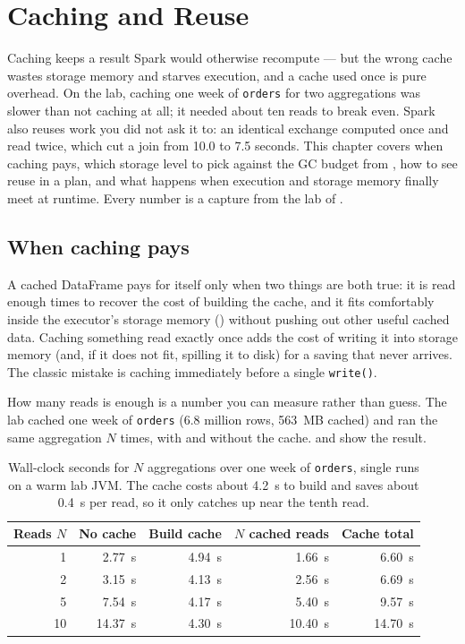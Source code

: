\chapter{Caching and Reuse}
\label{ch:caching}

\begin{chapterintro}
Caching keeps a result Spark would otherwise recompute --- but the wrong cache
wastes storage memory and starves execution, and a cache used once is pure
overhead. On the lab, caching one week of \texttt{orders} for two aggregations
was slower than not caching at all; it needed about ten reads to break even.
Spark also reuses work you did not ask it to: an identical exchange computed once
and read twice, which cut a join from 10.0 to 7.5 seconds. This chapter covers
when caching pays, which storage level to pick against the GC budget from
, how to see reuse in a plan, and what happens when execution
and storage memory finally meet at runtime. Every number is a capture from the
lab of .
\end{chapterintro}

\section{When caching pays}
\label{sec:caching-when}

A cached DataFrame pays for itself only when two things are both true: it is read
enough times to recover the cost of building the cache, and it fits comfortably
inside the executor's storage memory () without pushing out
other useful cached data. Caching something read exactly once adds the cost of
writing it into storage memory (and, if it does not fit, spilling it to disk) for
a saving that never arrives. The classic mistake is caching immediately before a
single \texttt{write()}.

How many reads is enough is a number you can measure rather than guess. The lab
cached one week of \texttt{orders} (6.8 million rows, 563~MB cached) and ran the
same aggregation $N$ times, with and without the cache.
 and  show the result.

\begin{table}[htbp]
\centering\footnotesize
\renewcommand{\arraystretch}{1.25}
\begin{tabular}{@{}rrrrr@{}}
\toprule
\textbf{Reads} $N$ & \textbf{No cache} & \textbf{Build cache} & \textbf{$N$ cached reads} & \textbf{Cache total} \\
\midrule
1 & 2.77~s & 4.94~s & 1.66~s & 6.60~s \\
2 & 3.15~s & 4.13~s & 2.56~s & 6.69~s \\
5 & 7.54~s & 4.17~s & 5.40~s & 9.57~s \\
10 & 14.37~s & 4.30~s & 10.40~s & 14.70~s \\
\bottomrule
\end{tabular}
\caption{Wall-clock seconds for $N$ aggregations over one week of \texttt{orders},
single runs on a warm lab JVM. The cache costs about 4.2~s to build and saves
about 0.4~s per read, so it only catches up near the tenth read.}
\label{tab:caching-lab-breakeven}
\end{table}

